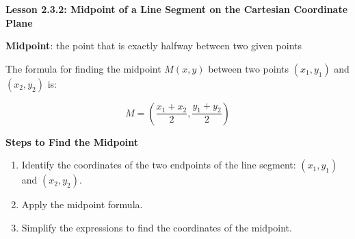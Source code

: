  \begin{center}
\textbf{Lesson 2.3.2: Midpoint of a Line Segment on the Cartesian Coordinate Plane}
\end{center}

\vspace*{1ex}

\noindent\textbf{Midpoint}: the point that is exactly halfway between two given points

The formula for finding the midpoint \(M(x, y)\) between two points \((x_1, y_1)\) and \((x_2, y_2)\) is:

\[
M = \left( \frac{x_1 + x_2}{2}, \frac{y_1 + y_2}{2} \right)
\]

\noindent\textbf{Steps to Find the Midpoint}
\begin{enumerate}
    \item Identify the coordinates of the two endpoints of the line segment: \((x_1, y_1)\) and \((x_2, y_2)\).
    \item Apply the midpoint formula.
    \item Simplify the expressions to find the coordinates of the midpoint.
\end{enumerate}




 
